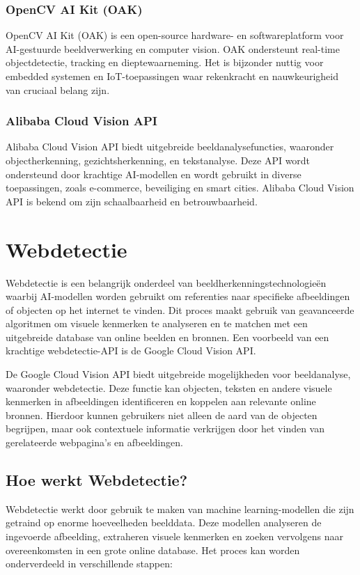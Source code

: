\subsubsection{OpenCV AI Kit (OAK)}
OpenCV AI Kit (OAK) is een open-source hardware- en softwareplatform voor AI-gestuurde beeldverwerking en computer vision. OAK ondersteunt real-time objectdetectie, tracking en dieptewaarneming. Het is bijzonder nuttig voor embedded systemen en IoT-toepassingen waar rekenkracht en nauwkeurigheid van cruciaal belang zijn\autocite{opencv}.

\subsubsection{Alibaba Cloud Vision API}
Alibaba Cloud Vision API biedt uitgebreide beeldanalysefuncties, waaronder objectherkenning, gezichtsherkenning, en tekstanalyse. Deze API wordt ondersteund door krachtige AI-modellen en wordt gebruikt in diverse toepassingen, zoals e-commerce, beveiliging en smart cities. Alibaba Cloud Vision API is bekend om zijn schaalbaarheid en betrouwbaarheid\autocite{alibaba}.

\section{Webdetectie}
Webdetectie is een belangrijk onderdeel van beeldherkenningstechnologieën waarbij AI-modellen worden gebruikt om referenties naar specifieke afbeeldingen of objecten op het internet te vinden. Dit proces maakt gebruik van geavanceerde algoritmen om visuele kenmerken te analyseren en te matchen met een uitgebreide database van online beelden en bronnen. Een voorbeeld van een krachtige webdetectie-API is de Google Cloud Vision API.

De Google Cloud Vision API biedt uitgebreide mogelijkheden voor beeldanalyse, waaronder webdetectie. Deze functie kan objecten, teksten en andere visuele kenmerken in afbeeldingen identificeren en koppelen aan relevante online bronnen. Hierdoor kunnen gebruikers niet alleen de aard van de objecten begrijpen, maar ook contextuele informatie verkrijgen door het vinden van gerelateerde webpagina's en afbeeldingen.

\subsection{Hoe werkt Webdetectie?}
Webdetectie werkt door gebruik te maken van machine learning-modellen die zijn getraind op enorme hoeveelheden beelddata. Deze modellen analyseren de ingevoerde afbeelding, extraheren visuele kenmerken en zoeken vervolgens naar overeenkomsten in een grote online database. Het proces kan worden onderverdeeld in verschillende stappen:

